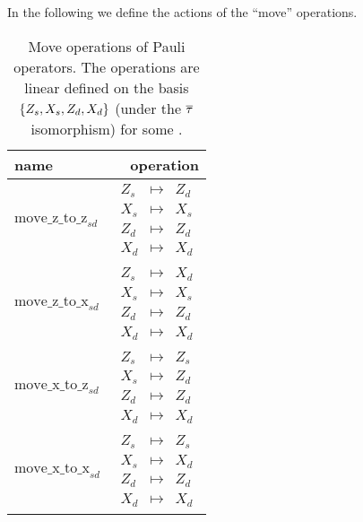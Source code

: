 \documentclass[a4paper,english]{scrartcl}
\begin{document}
\begin{definition}
In the following we define the actions of the ``move'' operations.
\begin{table}[H]
\center
\caption[Move operations of Pauli operators]{Move operations of Pauli operators. The
operations are linear defined on the basis $\bc{Z_s, X_s, Z_d, X_d}$ (under the $\overline{\tau}$
isomorphism) for some \en[s, d].}
\begin{tabular}{lr}
  \toprule
  name & operation\\
  \midrule
  $\mathrm{move\_z\_to\_z}_{sd}$ & $\begin{array}{ccc}
    Z_s&\mapsto&Z_d\\X_s&\mapsto&X_s\\Z_d&\mapsto&Z_d\\X_d&\mapsto&X_d\end{array}$\\
  \midrule
  $\mathrm{move\_z\_to\_x}_{sd}$ & $\begin{array}{ccc}
    Z_s&\mapsto&X_d\\X_s&\mapsto&X_s\\Z_d&\mapsto&Z_d\\X_d&\mapsto&X_d\end{array}$\\
  \midrule
  $\mathrm{move\_x\_to\_z}_{sd}$ & $\begin{array}{ccc}
    Z_s&\mapsto&Z_s\\X_s&\mapsto&Z_d\\Z_d&\mapsto&Z_d\\X_d&\mapsto&X_d\end{array}$\\
  \midrule
  $\mathrm{move\_x\_to\_x}_{sd}$ & $\begin{array}{ccc}
    Z_s&\mapsto&Z_s\\X_s&\mapsto&X_d\\Z_d&\mapsto&Z_d\\X_d&\mapsto&X_d\end{array}$\\
  \bottomrule
\end{tabular}
\end{table}
\end{definition}
\end{document}
